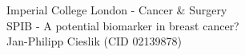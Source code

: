 \documentclass[12pt,a4paper]{article}
\begin{document}
\begin{titlepage}
	\centering
	{Imperial College London - Cancer \& Surgery}\\
	\vspace{12cm}
	{SPIB - A potential biomarker in breast cancer?}\\
	\vspace{3cm}
	Jan-Philipp Cieslik (CID 02139878) \\
    
\end{titlepage}

\newpage
\justifying
{} 










\newpage


\newpage
  

\newpage
{} 
\end{document}

